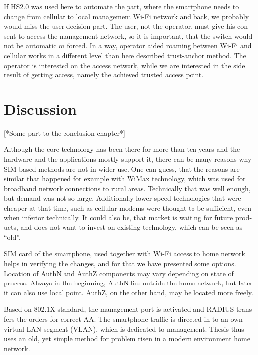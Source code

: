 \documentclass[12pt,a4paper,english]{tutthesis}
\begin{document}
\begin{otherlanguage}{english}
If HS2.0 was used here to automate the part, where
the smartphone needs to change from cellular to local
management Wi-Fi network and back, we probably would
miss the user decision part. The user, not the operator,
 must give his consent to access the management network, so
it is important, that the switch would not be automatic or forced.
In a way, operator aided roaming between Wi-Fi and cellular
works in a different level than here described trust-anchor method.
The operator is interested on the access network, while
we are interested in the side result of getting access, namely 
the achieved trusted access point.






\section{Discussion}
\label{sec-6-5}

[*Some part to the conclusion chapter*]

Although the core technology has been there for more than ten years and
the hardware and the applications mostly support it, 
there can be many reasons why SIM-based methods are not in wider use. 
One can guess, that the reasons are similar that happened for example with 
WiMax technology, which was used for broadband network connections to
rural areas. Technically that was well enough, but demand was not so
large. Additionally lower speed technologies that were cheaper at that
time, such as cellular modems were thought to be sufficient, even when
inferior technically.
It could also be, that market is waiting for future products, and does 
not want to invest on existing technology, which can be seen as ``old''.



SIM card of the smartphone, used together with Wi-Fi access to home network 
helps in verifying the changes, and for that we have presented some options.
Location of AuthN and AuthZ components may vary depending on state of process.
Always in the beginning, AuthN lies outside the home network, but
later it can also use local point. AuthZ, on the other hand, may be located more freely.

Based on 802.1X standard, the management port is activated and
RADIUS transfers the orders for correct AA.
The smartphone traffic is directed in to an own virtual LAN segment (VLAN),
which is dedicated to management.
Thesis thus uses an old, yet simple method for problem risen in a modern environment home network.


\end{otherlanguage}
\end{document}
